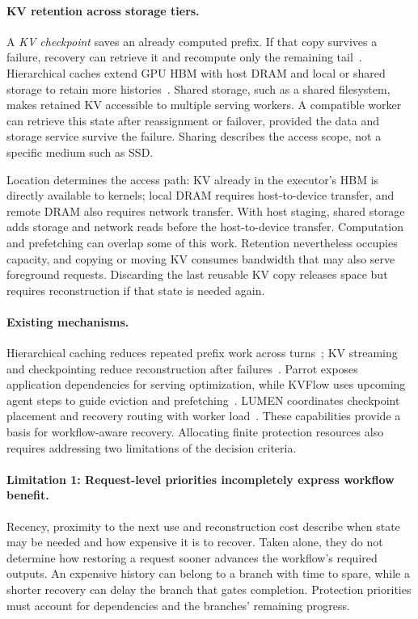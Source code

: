 \paragraph{KV retention across storage tiers.}
A \emph{KV checkpoint} saves an already computed prefix. If that copy
survives a failure, recovery can retrieve it and recompute only the
remaining tail~\cite{strati2024dejavu,jayakody2026ghostserve}.
Hierarchical caches extend GPU HBM with host DRAM and local or shared
storage to retain more histories~\cite{gao2024cachedattention,qin2025mooncake}.
Shared storage, such as a shared filesystem, makes retained KV accessible
to multiple serving workers. A compatible worker can retrieve this state
after reassignment or failover, provided the data and storage service
survive the failure. Sharing describes the access scope, not a specific
medium such as SSD.

Location determines the access path: KV already in the executor's HBM
is directly available to kernels; local DRAM requires host-to-device
transfer, and remote DRAM also requires network transfer. With host
staging, shared storage adds storage and network reads before the
host-to-device transfer. Computation and prefetching can overlap some
of this work. Retention nevertheless occupies
capacity, and copying or moving KV consumes bandwidth that may also serve
foreground requests. Discarding the last reusable KV copy releases space
but requires reconstruction if that state is needed again.

\paragraph{Existing mechanisms.}
Hierarchical caching reduces repeated prefix work across
turns~\cite{gao2024cachedattention,qin2025mooncake}; KV streaming and
checkpointing reduce reconstruction after
failures~\cite{strati2024dejavu,jayakody2026ghostserve}.
Parrot exposes application dependencies for serving optimization, while
KVFlow uses upcoming agent steps to guide eviction and
prefetching~\cite{lin2024parrot,pan2025kvflow}. LUMEN coordinates
checkpoint placement and recovery routing with worker
load~\cite{cao2026lumen}. These capabilities provide a basis for
workflow-aware recovery. Allocating finite protection resources also
requires addressing two limitations of the decision criteria.

\paragraph{Limitation 1: Request-level priorities incompletely express
workflow benefit.}
Recency, proximity to the next use and reconstruction cost describe when
state may be needed and how expensive it is to recover. Taken alone,
they do not determine how restoring a request sooner advances the
workflow's required outputs. An expensive history can belong to a branch
with time to spare, while a shorter recovery can delay the branch that
gates completion. Protection priorities must account for dependencies
and the branches' remaining progress.

